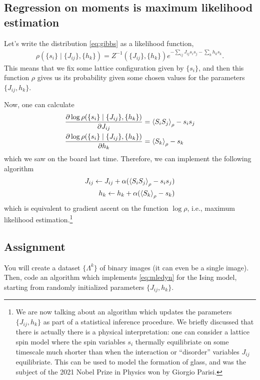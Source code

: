 \documentclass[11pt]{article}
\begin{document}
\subsection{Regression on moments is maximum likelihood estimation}
\label{sec:org548d8a3}
Let's write the distribution \eqref{eq:gibbs} as a likelihood function,
\begin{align*}
\rho(\{s_{i}\} \mid \{J_{ij}\}, \{h_{k}\}) = Z^{-1}(\{J_{ij}\}, \{h_{k}\})
e^{-\sum_{ij} J_{ij}s_{i}s_{j} -\sum_{k} h_{k}s_{k}}.
\end{align*}
This means that we fix some lattice configuration given by \(\{s_{i}\}\), and
then this function \(\rho\) gives us its probability given some chosen values
for the parameters \(\{J_{ij}, h_{k}\}\).

Now, one can calculate
\begin{align*}
\pdv{\log \rho(\{s_{i}\} \mid \{J_{ij}\}, \{h_{k}\})}{J_{ij}} &= \ev{S_{i}S_{j}}_{\rho} - s_{i}s_{j} \\
\pdv{\log \rho(\{s_{i}\} \mid \{J_{ij}\}, \{h_{k}\})}{h_{k}} &= \ev{S_{k}}_{\rho} - s_{k}
\end{align*}
which we saw on the board last time. Therefore, we can implement the following algorithm
\begin{align}
\label{eq:mledyn}
\begin{split}
J_{ij} \leftarrow J_{ij} + \alpha(\ev{S_{i}S_{j}}_{\rho} - s_{i}s_{j}) \\
h_{k} \leftarrow h_{k} + \alpha(\ev{S_{k}}_{\rho} - s_{k})
\end{split}
\end{align}
which is equivalent to gradient ascent on the function \(\log \rho\), i.e.,
maximum likelihood estimation.\footnote{We are now talking about an algorithm which updates the parameters
\(\{J_{ij}, h_{k}\}\) as part of a statistical inference procedure. We briefly
discussed that there is actually there is a physical interpretation: one can
consider a lattice spin model where the spin variables \(s_{i}\) thermally
equilibriate on some timescale much shorter than when the interaction or
``disorder'' variables \(J_{ij}\) equilibriate. This can be used to model the
formation of glass, and was the subject of the 2021 Nobel Prize in Physics won
by Giorgio Parisi.}
\subsection{Assignment}
\label{sec:org77d62bb}
You will create a dataset \(\{\Lambda^{k}\}\) of binary images (it can even be a
single image). Then, code an algorithm which implements \eqref{eq:mledyn} for
the Ising model, starting from randomly initialized parameters \(\{J_{ij},
h_{k}\}\).
\end{document}
